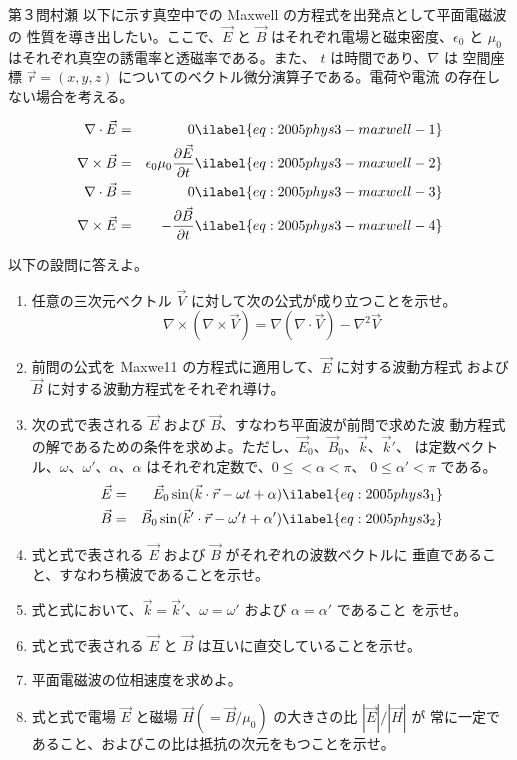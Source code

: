 \begin{question}{第３問}{村瀬}
以下に示す真空中での Maxwell の方程式を出発点として平面電磁波の
性質を導き出したい。ここで、$\vec E$ と $\vec B$ はそれぞれ電場と磁束密度、$\epsilon_0$ と
$\mu_0$ はそれぞれ真空の誘電率と透磁率である。また、 $t$ は時間であり、$\nabla$ は
空間座標 $\vec r=(x,y,z)$ についてのベクトル微分演算子である。電荷や電流
の存在しない場合を考える。

\begin{eqnarray}
\nabla\cdot\vec E &=& 0 \ilabel{eq:2005phys3-maxwell-1}\\
\nabla\times\vec B &=& \epsilon_0\mu_0\frac{\partial \vec E}{\partial t} \ilabel{eq:2005phys3-maxwell-2}\\
\nabla\cdot\vec B &=& 0 \ilabel{eq:2005phys3-maxwell-3}\\
\nabla\times\vec E &=& -\frac{\partial \vec B}{\partial t} \ilabel{eq:2005phys3-maxwell-4}
\end{eqnarray}

以下の設問に答えよ。
\begin{enumerate}
\item
  任意の三次元ベクトル $\vec V$ に対して次の公式が成り立つことを示せ。
  \[\nabla\times(\nabla\times\vec V)=\nabla(\nabla\cdot\vec V)-\nabla^2\vec V\]
\item
  前問の公式を Maxwe11 の方程式に適用して、$\vec E$ に対する波動方程式
  および $\vec B$ に対する波動方程式をそれぞれ導け。
\item
  次の式で表される $\vec E$ および $\vec B$、すなわち平面波が前問で求めた波
  動方程式の解であるための条件を求めよ。ただし、$\vec E_0$、$\vec B_0$、$\vec k$、$\vec k'$、
  は定数ベクトル、$\omega$、$\omega'$、$\alpha$、$\alpha$ はそれぞれ定数で、$0\leq<\alpha<\pi$、
  $0\leq\alpha'<\pi$ である。
  \begin{eqnarray}
  \vec E &=& \vec E_0\sin(\vec k\cdot\vec r -\omega t + \alpha) \ilabel{eq:2005phys3_1}\\
  \vec B &=& \vec B_0\sin(\vec k'\cdot\vec r -\omega' t + \alpha') \ilabel{eq:2005phys3_2}
  \end{eqnarray}
\item
  式と式で表される $\vec E$ および $\vec B$ がそれぞれの波数ベクトルに
  垂直であること、すなわち横波であることを示せ。
\item
  式と式において、$\vec k=\vec k'$、$\omega=\omega'$ および $\alpha=\alpha'$ であること
  を示せ。
\item
  式と式で表される $\vec E$ と $\vec B$ は互いに直交していることを示せ。
\item
  平面電磁波の位相速度を求めよ。
\item
  式と式で電場 $\vec E$ と磁場 $\vec H (=\vec B/\mu_0)$ の大きさの比 $|\vec E|/|\vec H|$ が
  常に一定であること、およびこの比は抵抗の次元をもつことを示せ。
\end{enumerate}
\end{question}
